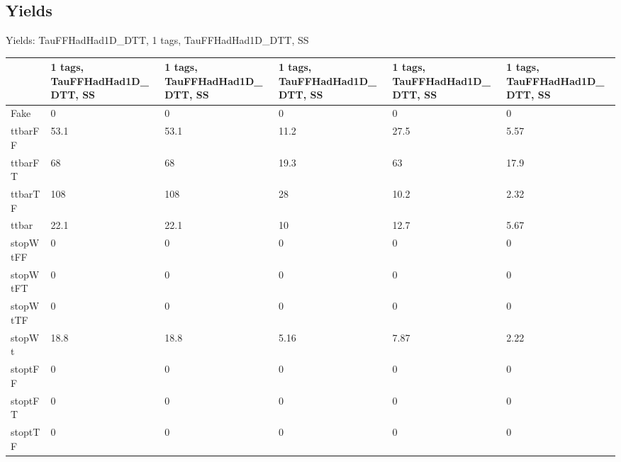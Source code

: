 
\subsection{Yields}

\begin{frame}{Yields: TauFFHadHad1D\_DTT, 1 tags, TauFFHadHad1D\_DTT, SS}
\begin{center}
  \begin{tabular}{l| >{\centering\let\newline\\\arraybackslash\hspace{0pt}}m{1.4cm}| >{\centering\let\newline\\\arraybackslash\hspace{0pt}}m{1.4cm}| >{\centering\let\newline\\\arraybackslash\hspace{0pt}}m{1.4cm}| >{\centering\let\newline\\\arraybackslash\hspace{0pt}}m{1.4cm}| >{\centering\let\newline\\\arraybackslash\hspace{0pt}}m{1.4cm}}
    & 1 tags, TauFFHadHad1D\_DTT, SS & 1 tags, TauFFHadHad1D\_DTT, SS & 1 tags, TauFFHadHad1D\_DTT, SS & 1 tags, TauFFHadHad1D\_DTT, SS & 1 tags, TauFFHadHad1D\_DTT, SS \\
 \hline \hline
    Fake& 0 & 0 & 0 & 0 & 0 \\
 \hline
    ttbarFF& 53.1 & 53.1 & 11.2 & 27.5 & 5.57 \\
 \hline
    ttbarFT& 68 & 68 & 19.3 & 63 & 17.9 \\
 \hline
    ttbarTF& 108 & 108 & 28 & 10.2 & 2.32 \\
 \hline
    ttbar& 22.1 & 22.1 & 10 & 12.7 & 5.67 \\
 \hline
    stopWtFF& 0 & 0 & 0 & 0 & 0 \\
 \hline
    stopWtFT& 0 & 0 & 0 & 0 & 0 \\
 \hline
    stopWtTF& 0 & 0 & 0 & 0 & 0 \\
 \hline
    stopWt& 18.8 & 18.8 & 5.16 & 7.87 & 2.22 \\
 \hline
    stoptFF& 0 & 0 & 0 & 0 & 0 \\
 \hline
    stoptFT& 0 & 0 & 0 & 0 & 0 \\
 \hline
    stoptTF& 0 & 0 & 0 & 0 & 0 \\

\end{tabular}
\end{center}
\end{frame}
